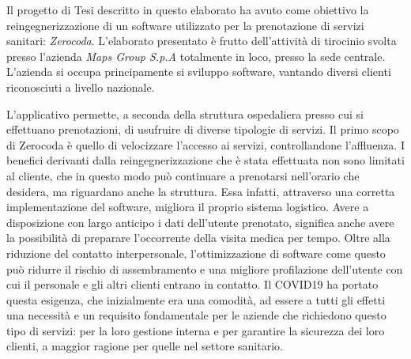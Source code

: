 \documentclass[a4paper,11pt]{article}
\begin{document}
	\maketitle
	   Il progetto di Tesi descritto in questo elaborato ha avuto come obiettivo la reingegnerizzazione di un software utilizzato per la prenotazione di servizi sanitari: \emph{Zerocoda}. L'elaborato presentato è frutto dell'attività di tirocinio svolta presso l'azienda \emph{Maps Group S.p.A} totalmente in loco, presso la sede centrale. L'azienda si occupa principamente si sviluppo software, vantando diversi clienti riconosciuti a livello nazionale.
	   
	   L'applicativo permette, a seconda della struttura ospedaliera presso cui si effettuano prenotazioni, di usufruire di diverse tipologie di servizi. Il primo scopo di Zerocoda è quello di velocizzare l'accesso ai servizi, controllandone l’affluenza. I benefici derivanti dalla reingegnerizzazione che è stata effettuata non sono limitati al cliente, che in questo modo può continuare a prenotarsi nell'orario che desidera, ma riguardano anche la struttura. Essa infatti, attraverso una corretta implementazione del software, migliora il proprio sistema logistico. Avere a disposizione con largo anticipo i dati dell'utente prenotato, significa anche avere la possibilità di preparare l'occorrente della visita medica per tempo. Oltre alla riduzione del contatto interpersonale, l’ottimizzazione di software come questo può ridurre il rischio di assembramento e una migliore profilazione dell’utente con cui il personale e gli altri clienti entrano in contatto. Il COVID19 ha portato questa esigenza, che inizialmente era una comodità, ad essere a tutti gli effetti una necessità e un requisito fondamentale per le aziende che richiedono questo tipo di servizi: per la loro gestione interna e per garantire la sicurezza dei loro clienti, a maggior ragione per quelle nel settore sanitario. 
	   
\end{document}
